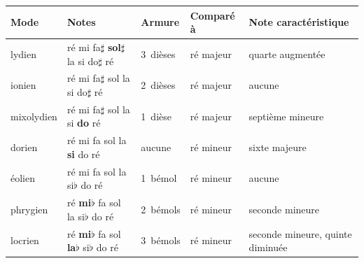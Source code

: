 {\small\setlength{\tabcolsep}{5pt}%
\begin{tabular}{@{}l l l l l@{}}
\toprule
\textbf{Mode} & \textbf{Notes} & \textbf{Armure} & \textbf{Comparé à} & \textbf{Note caractéristique} \\
\midrule
lydien & ré mi fa$\sharp$ \textcolor{accent}{\textbf{sol$\sharp$}} la si do$\sharp$ ré & 3~dièses & ré majeur & quarte augmentée \\
ionien & ré mi fa$\sharp$ sol la si do$\sharp$ ré & 2~dièses & ré majeur & aucune \\
mixolydien & ré mi fa$\sharp$ sol la si \textcolor{accent}{\textbf{do}} ré & 1~dièse & ré majeur & septième mineure \\
dorien & ré mi fa sol la \textcolor{accent}{\textbf{si}} do ré & aucune & ré mineur & sixte majeure \\
éolien & ré mi fa sol la si$\flat$ do ré & 1~bémol & ré mineur & aucune \\
phrygien & ré \textcolor{accent}{\textbf{mi$\flat$}} fa sol la si$\flat$ do ré & 2~bémols & ré mineur & seconde mineure \\
locrien & ré \textcolor{accent}{\textbf{mi$\flat$}} fa sol \textcolor{accent}{\textbf{la$\flat$}} si$\flat$ do ré & 3~bémols & ré mineur & seconde mineure, quinte diminuée \\
\bottomrule
\end{tabular}}
